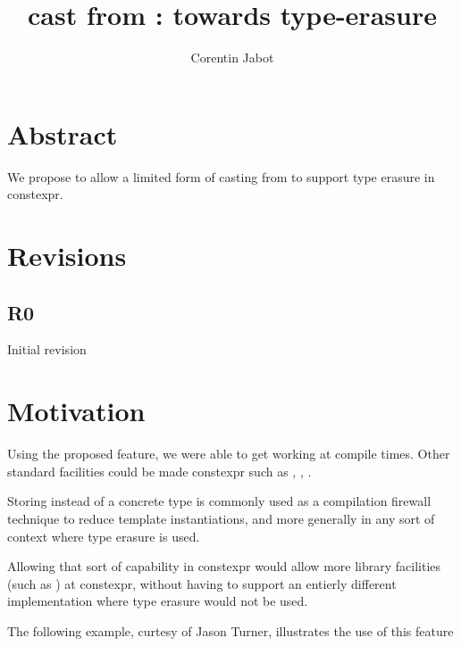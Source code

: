 \documentclass{wg21}
\title{\tcode{constexpr} cast from \tcode{void*}: towards \tcode{constexpr} type-erasure}
\author{Corentin Jabot}{corentin.jabot@gmail.com}
\begin{document}
\maketitle

\section{Abstract}

We propose to allow a limited form of casting from  to support type erasure in constexpr.

\section{Revisions}

\subsection{R0}

Initial revision

\section{Motivation}

Using the proposed feature, we were able to get  working at compile times.
Other standard facilities could be made constexpr such as , , .

Storing  instead of a concrete type is commonly used as a compilation firewall technique to reduce template
instantiations, and more generally in any sort of context where type erasure is used.

Allowing that sort of capability in constexpr would allow more library facilities (such as ) at constexpr,
without having to support an entierly different  implementation where type erasure would not be used.

\pagebreak

The following example, curtesy of Jason Turner, illustrates the use of this feature
\end{document}
